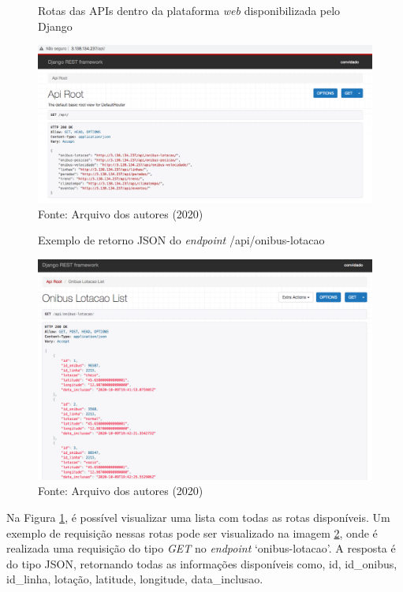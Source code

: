 \begin{figure}[H]
    \centering
    \caption{Rotas das APIs dentro da plataforma \textit{web} disponibilizada pelo Django}
    \includegraphics[width=1.0\linewidth]{Imagens/rotasDisponiveis.png}
    \caption*{Fonte: Arquivo dos autores (2020)}
    \label{rotasDisponiveis}
\end{figure}
\begin{figure}[H]
    \centering
    \caption{Exemplo de retorno JSON do \textit{endpoint} /api/onibus-lotacao}
    \includegraphics[width=1.0\linewidth]{Imagens/onibusLotacaoExemplo.png}
    \caption*{Fonte: Arquivo dos autores (2020)}
    \label{onibusLotacaoExemplo}
\end{figure}
\indent
\par Na Figura \ref{rotasDisponiveis}, é possível visualizar uma lista com todas as rotas disponíveis. Um exemplo de requisição nessas rotas pode ser visualizado na imagem \ref{onibusLotacaoExemplo}, onde é realizada uma requisição do tipo \textit{GET} no \textit{endpoint} ‘onibus-lotacao’. A resposta é do tipo JSON, retornando todas as informações disponíveis como, id, id\_onibus, id\_linha, lotação, latitude, longitude, data\_inclusao.

